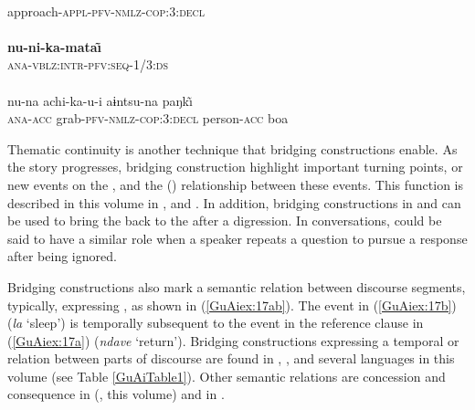 \documentclass[output=paper]{LSP/langsci}
\begin{document}
\pagebreak
\begin{exe}
\ex \label{GuAiex:36ac}
\begin{xlist}
\ex \label{GuAiex:36a}
\gll \underline{}\\
 approach-\textsc{appl-pfv-nmlz-cop:3:decl}\\
\glt {} \\
\ex \label{GuAiex:36b}
\gll  \textbf{nu-ni-ka-mata\~\i}\\
\textsc{ana-vblz:intr}{}-\textsc{pfv:seq-1/3:ds}\\
\glt {}\\
\ex \label{GuAiex:36c}
\gll  nu-na         achi-ka-u-i                         aɨntsu-na   paŋk\~\i\\
\textsc{ana-acc}   grab-\textsc{pfv-nmlz-cop:3:decl}   person-\textsc{acc}   boa\\
\glt {}
\end{xlist}
\end{exe}


Thematic continuity is another  technique that bridging constructions enable. As the story progresses, bridging construction highlight important turning points, or new events on the , and the () relationship between these events. This function is described in this volume in ,  and . In addition, bridging constructions in  and  can be used to bring the  back to the  after a digression. In  conversations,  could be said to have a similar role when a speaker repeats a question to pursue a response after being ignored.

Bridging constructions also mark a semantic relation between discourse segments, typically, expressing , as shown in (\ref{GuAiex:17ab}). The event in (\ref{GuAiex:17b}) (\textit{la} `sleep') is temporally subsequent to the event in the reference clause in (\ref{GuAiex:17a}) (\textit{ndave} `return'). Bridging constructions expressing a temporal or  relation between parts of discourse are found in  \citep[][314]{bromley81},  \citep[][516]{kasia17}, and several languages in this volume (see Table \ref{GuAiTable1}). Other semantic relations are concession and consequence in  (\citeauthor{aiton18}, this volume) and in  \citep[][499--502]{overall17}. 
\end{document}
